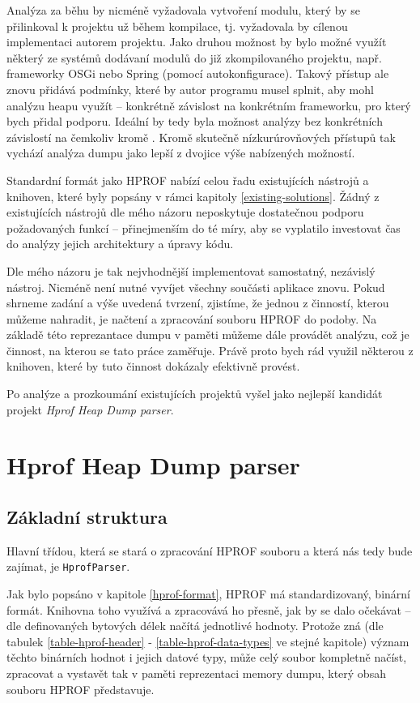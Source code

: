 Analýza za běhu by nicméně vyžadovala vytvoření modulu, který by se přilinkoval k projektu už během kompilace, tj. vyžadovala by cílenou implementaci autorem projektu. Jako druhou možnost by bylo možné využít některý ze systémů dodávaní modulů do již zkompilovaného projektu, např. frameworky OSGi nebo Spring (pomocí autokonfigurace). Takový přístup ale znovu přidává podmínky, které by autor programu musel splnit, aby mohl analýzu heapu využít -- konkrétně závislost na konkrétním frameworku, pro který bych přidal podporu. Ideální by tedy byla možnost analýzy bez konkrétních závislostí na čemkoliv kromě . Kromě skutečně nízkurúrovňových přístupů tak vychází analýza dumpu jako lepší z dvojice výše nabízených možností. 

Standardní formát jako HPROF nabízí celou řadu existujících nástrojů a knihoven, které byly popsány v rámci kapitoly \ref{existing-solutions}. Žádný z existujících nástrojů dle mého názoru neposkytuje dostatečnou podporu požadovaných funkcí -- přinejmenším do té míry, aby se vyplatilo investovat čas do analýzy jejich architektury a úpravy kódu.

Dle mého názoru je tak nejvhodnější implementovat samostatný, nezávislý nástroj. Nicméně není nutné vyvíjet všechny součásti aplikace znovu. Pokud shrneme zadání a výše uvedená tvrzení, zjistíme, že jednou z činností, kterou můžeme nahradit, je načtení a zpracování souboru HPROF do  podoby. Na základě této reprezantace dumpu v paměti můžeme dále provádět analýzu, což je činnost, na kterou se tato práce zaměřuje. Právě proto bych rád využil některou z knihoven, které by tuto činnost dokázaly efektivně provést.

Po analýze a prozkoumání existujících projektů vyšel jako nejlepší kandidát projekt \textit{Hprof Heap Dump parser}.

\section{Hprof Heap Dump parser}
\label{hprof-heap-dump-parser}
\subsection{Základní struktura}
Hlavní třídou, která se stará o zpracování HPROF souboru a která nás tedy bude zajímat, je \texttt{HprofParser}. 

Jak bylo popsáno v kapitole \ref{hprof-format}, HPROF má standardizovaný, binární formát. Knihovna toho využívá a zpracovává ho přesně, jak by se dalo očekávat -- dle definovaných bytových délek načítá jednotlivé hodnoty. Protože zná (dle tabulek \ref{table-hprof-header} - \ref{table-hprof-data-types} ve stejné kapitole) význam těchto binárních hodnot i jejich datové typy, může celý soubor kompletně načíst, zpracovat a vystavět tak v paměti reprezentaci memory dumpu, který obsah souboru HPROF představuje.

